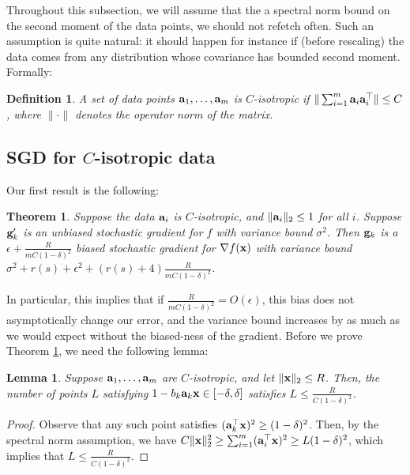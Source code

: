 \documentclass{article}
\def\a{{\bf a}}
\def\g{{\bf g}}
\def\x{{\bf x}}
\newtheorem{lemma}{Lemma}
\newtheorem{theorem}{Theorem}
\newtheorem{definition}{Definition}
\begin{document}
Throughout this subsection, we will assume that the a spectral norm bound on the second moment of the data points, we should not refetch often.
Such an assumption is quite natural: it should happen for instance if (before rescaling) the data comes from any distribution whose covariance has bounded second moment.
Formally:
\begin{definition}
A set of data points $\a_1, \ldots, \a_m$ is \emph{$C$-isotropic} if $\| \sum_{i = 1}^m \a_i \a_i^\top \| \leq C$, where $\| \cdot \|$ denotes the operator norm of the matrix.
\end{definition}

\subsection{SGD for $C$-isotropic data}
Our first result is the following:
\begin{theorem}
\label{thm:sgd-C}
Suppose the data $\a_i$ is $C$-isotropic, and $\| \a_i \|_2 \leq 1$ for all $i$.
Suppose $\g'_k$ is an unbiased stochastic gradient for $f$ with variance bound $\sigma^2$.
Then $\g_k$ is a $\epsilon + \frac{R}{m C (1 - \delta)^2}$ biased stochastic gradient for $\nabla f (\x)$ with variance bound $\sigma^2 + r(s) + \epsilon^2 +   (r(s) + 4)\frac{R}{m C (1 - \delta)^2} $.
\end{theorem}

In particular, this implies that if $\frac{R}{m C (1 - \delta)^2} = O(\epsilon)$, this bias does not asymptotically change our error, and the variance bound increases by as much as we would expect without the biased-ness of the gradient.
Before we prove Theorem \ref{thm:sgd-C}, we need the following lemma:

\begin{lemma}
\label{lem:C-isotropic}
Suppose $\a_1, \ldots, \a_m$ are $C$-isotropic, and let $\| \x \|_2 \leq R$.
Then, the number of points $L$ satisfying $1 - b_k \a_k \x \in [-\delta, \delta]$ satisfies $L \leq \frac{R}{C(1 - \delta)^2}$.
\end{lemma}
\begin{proof}
Observe that any such point satisfies $(\a_k^\top \x)^2 \geq (1 - \delta)^2$.
Then, by the spectral norm assumption, we have $C \| \x \|_2^2 \geq \sum_{i = 1}^m (\a_i^\top \x)^2 \geq L (1 - \delta)^2$, which implies that $L \leq \frac{R}{C(1 - \delta)^2}$.
\end{proof}
\end{document}
